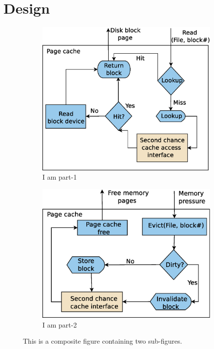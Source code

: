 \documentclass[a4paper, 10pt]{report}
\begin{document}
\section{Design}
\begin{figure}
\centering
\begin{subfigure}{0.41\linewidth}
\includegraphics[width=\columnwidth]{cc_get.eps}
 \caption{I am part-1}
 \label{fig:part1}
\end{subfigure} \hfill
%
\begin{subfigure}{0.41\linewidth}
\includegraphics[width=\columnwidth]{evict.eps}
 \caption{I am part-2}
 \label{fig:part2}
\end{subfigure} \hfill
%
\caption{This is a composite figure containing two sub-figures.}
\label{fig:composite}
\end{figure}
\end{document}
